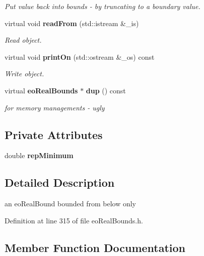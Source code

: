 \begin{CompactItemize}
\begin{CompactList}\small\item\em Put value back into bounds - by truncating to a boundary value. \item\end{CompactList}\item 
virtual void {\bf read\-From} (std::istream \&\_\-is)
\begin{CompactList}\small\item\em Read object. \item\end{CompactList}\item 
virtual void {\bf print\-On} (std::ostream \&\_\-os) const 
\begin{CompactList}\small\item\em Write object. \item\end{CompactList}\item 
virtual {\bf eo\-Real\-Bounds} $\ast$ {\bf dup} () const \label{classeo_real_below_bound_a15}

\begin{CompactList}\small\item\em for memory managements - ugly \item\end{CompactList}\end{CompactItemize}
\subsection*{Private Attributes}
\begin{CompactItemize}
\item 
double {\bf rep\-Minimum}\label{classeo_real_below_bound_r0}

\end{CompactItemize}


\subsection{Detailed Description}
an eo\-Real\-Bound bounded from below only 



Definition at line 315 of file eo\-Real\-Bounds.h.

\subsection{Member Function Documentation}
